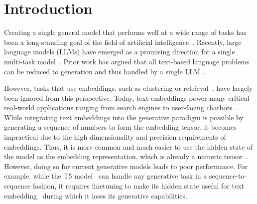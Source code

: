 \documentclass{article}
\begin{document}
\section{Introduction}
\label{sec:intro}

Creating a single general model that performs well at a wide range of tasks has been a long-standing goal of the field of artificial intelligence~\cite{kaiser2017model,jaegle2021perceiver,cho2021unifying,reed2022generalist,singh2022flava}. Recently, large language models (LLMs) have emerged as a promising direction for a single multi-task model~\cite{radford2019language,brown2020language}. Prior work has argued that all text-based language problems can be reduced to generation and thus handled by a single LLM~\cite{raffel2023exploring,du2021all}.

However, tasks that use embeddings, such as clustering or retrieval~\cite{muennighoff2023mteb}, have largely been ignored from this perspective. Today, text embeddings power many critical real-world applications ranging from search engines to user-facing chatbots~\cite{huang2020embedding,su2017chatbot}. While integrating text embeddings into the generative paradigm is possible by generating a sequence of numbers to form the embedding tensor, it becomes impractical due to the high dimensionality and precision requirements of embeddings. Thus, it is more common and much easier to use the hidden state of the model as the embedding representation, which is already a numeric tensor~\cite{muennighoff2022sgpt,wang2020sbertwk,morris2023text}. However, doing so for current generative models leads to poor performance. For example, while the T5 model~\cite{raffel2023exploring,sanh2022multitask} can handle any generative task in a sequence-to-sequence fashion, it requires finetuning to make its hidden state useful for text embedding~\cite{ni2021large,ni2021sentencet5} during which it loses its generative capabilities.

\end{document}
